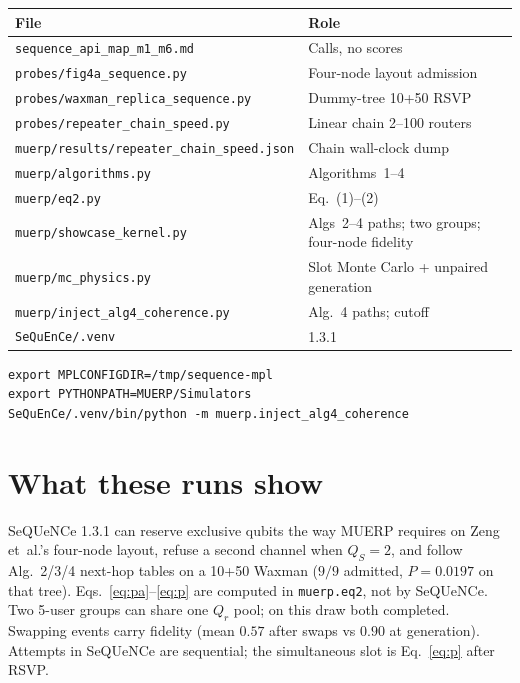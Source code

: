 \documentclass[11pt]{article}
\begin{document}
\begin{center}
\begin{tabular}{@{}ll@{}}
\toprule
File & Role \\
\midrule
\texttt{sequence\_api\_map\_m1\_m6.md} & Calls, no scores \\
\texttt{probes/fig4a\_sequence.py} & Four-node layout admission \\
\texttt{probes/waxman\_replica\_sequence.py} & Dummy-tree 10+50 RSVP \\
\texttt{probes/repeater\_chain\_speed.py} & Linear chain 2--100 routers \\
\texttt{muerp/results/repeater\_chain\_speed.json} & Chain wall-clock dump \\
\texttt{muerp/algorithms.py} & Algorithms~1--4 \\
\texttt{muerp/eq2.py} & Eq.~(1)--(2) \\
\texttt{muerp/showcase\_kernel.py} & Algs~2--4 paths; two groups; four-node fidelity \\
\texttt{muerp/mc\_physics.py} & Slot Monte Carlo + unpaired generation \\
\texttt{muerp/inject\_alg4\_coherence.py} & Alg.~4 paths; cutoff \\
\texttt{SeQuEnCe/.venv} & 1.3.1 \\
\bottomrule
\end{tabular}
\end{center}

\begin{verbatim}
export MPLCONFIGDIR=/tmp/sequence-mpl
export PYTHONPATH=MUERP/Simulators
SeQuEnCe/.venv/bin/python -m muerp.inject_alg4_coherence
\end{verbatim}

\section{What these runs show}

SeQUeNCe 1.3.1 can reserve exclusive qubits the way MUERP requires on Zeng et~al.'s four-node layout, refuse a second channel when $Q_S=2$, and follow Alg.~2/3/4 next-hop tables on a 10+50 Waxman ($9/9$ admitted, $P=0.0197$ on that tree).
Eqs.~\eqref{eq:pa}--\eqref{eq:p} are computed in \texttt{muerp.eq2}, not by SeQUeNCe.
Two 5-user groups can share one $Q_r$ pool; on this draw both completed.
Swapping events carry fidelity (mean $0.57$ after swaps vs $0.90$ at generation).
Attempts in SeQUeNCe are sequential; the simultaneous slot is Eq.~\eqref{eq:p} after RSVP.
\end{document}
